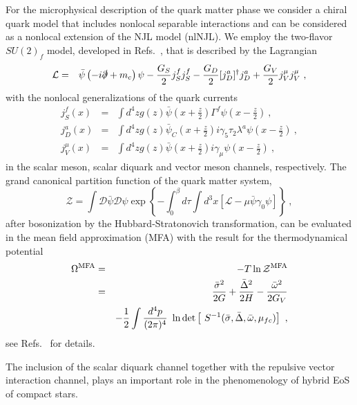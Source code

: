 \documentclass[%
 reprint,
superscriptaddress,
nofootinbib,
 amsmath,amssymb,
 aps,
]{revtex4-1}
\begin{document}
For the microphysical description of the quark matter phase we consider a chiral quark model that includes
nonlocal separable interactions and can be considered as a nonlocal extension of the NJL model (nlNJL). 
We employ the two-flavor $SU(2)_f$ model, developed in Refs.~\cite{Schmidt:1994di,GomezDumm:2005hy,Blaschke:2007ri}, that is described by the Lagrangian
\begin{eqnarray}
\mathcal{L} &=& \bar\psi\left(-i\slashed\partial+m_c\right)\psi - \frac{G_S}{2} j_S^f j_S^f 
- \frac{G_D}{2} [j_D^a]^\dagger j_D^a
+ \frac{G_V}{2} j_V^\mu j_V^\mu~,\nonumber\\
\end{eqnarray}
with the nonlocal generalizations of the quark currents
\begin{eqnarray}
j_S^f(x)&=& \int d^4z g(z) \bar\psi(x+\frac{z}{2})\Gamma^f \psi(x-\frac{z}{2})~,
\\
j_D^a(x)&=& \int d^4z g(z) \bar\psi_C(x+\frac{z}{2})i\gamma_5 \tau_2 \lambda^a \psi(x-\frac{z}{2})~,
\\
j_V^\mu(x)&=& \int d^4z g(z) \bar\psi(x+\frac{z}{2})i\gamma_\mu
\psi(x-\frac{z}{2})~,
\end{eqnarray}
in the scalar meson, scalar diquark and vector meson channels, respectively. 
The grand canonical partition function of the quark matter system, 
\begin{equation}
    \mathcal{Z} = \int \mathcal{D}\bar{\psi} \mathcal{D}\psi
    \exp\left\{-\int_0^\beta d\tau \int d^3x \left[ \mathcal{L} - \mu \bar{\psi} \gamma_0 \psi\right] \right\}
    ~,
\end{equation}
after bosonization by the Hubbard-Stratonovich transformation, can be evaluated in the mean field approximation (MFA) with the result for the thermodynamical potential
\begin{eqnarray}
\Omega^{\rm MFA}  &=&  - T \ln \mathcal{Z}^{\rm MFA}\\
&=&\frac{ \bar
\sigma^2 }{2 G} + \frac{ {\bar \Delta}^2}{2 H} 
- \frac{\bar \omega^2}{2 G_V} \nonumber\\
& &-\frac{1}{2} \int \frac{d^4 p}{(2\pi)^4} \ \ln
\mbox{det} \left[ \ S^{-1}(\bar \sigma ,\bar \Delta, \bar \omega,
\mu_{fc}) \right] ~,
\label{eq:mfaqmtp}
\end{eqnarray}
see Refs.~\cite{GomezDumm:2005hy,Blaschke:2007ri} for details.

The inclusion of the scalar diquark channel together with the repulsive vector interaction channel, plays an important role in the phenomenology of hybrid EoS of compact stars.
\end{document}
